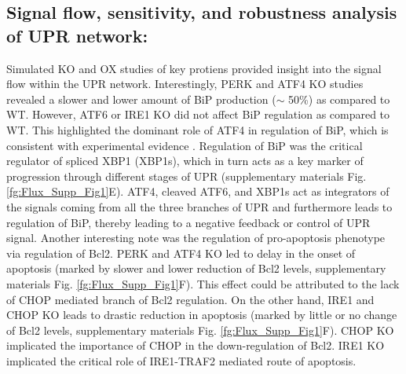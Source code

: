 \documentclass[fleqn,10pt]{wlscirep}
\begin{document}
\subsection*{Signal flow, sensitivity, and robustness analysis of UPR network:}
Simulated KO and OX studies of key protiens provided insight into the signal flow within the UPR network. Interestingly, PERK and ATF4 KO studies revealed a slower and lower amount of BiP production ($\sim$ 50\%) as compared to WT. However, ATF6 or IRE1 KO did not affect BiP regulation as compared to WT. This highlighted the dominant role of ATF4 in regulation of BiP, which is consistent with experimental evidence \cite{ma2003delineation}. Regulation of BiP was the critical regulator of spliced XBP1 (XBP1s), which in turn acts as a key marker of progression through different stages of UPR (supplementary materials Fig. \ref{fg:Flux_Supp_Fig1}E). ATF4, cleaved ATF6, and XBP1s act as integrators of the signals coming from all the three branches of UPR and furthermore leads to regulation of BiP, thereby leading to a negative feedback or control of UPR signal. Another interesting note was the regulation of pro-apoptosis phenotype via regulation of Bcl2. PERK and ATF4 KO led to delay in the onset of apoptosis (marked by slower and lower reduction of Bcl2 levels, supplementary materials Fig. \ref{fg:Flux_Supp_Fig1}F). This effect could be attributed to the lack of CHOP mediated branch of Bcl2 regulation. On the other hand, IRE1 and CHOP KO leads to drastic reduction in apoptosis (marked by little or no change of Bcl2 levels, supplementary materials Fig. \ref{fg:Flux_Supp_Fig1}F). CHOP KO implicated the importance of CHOP in the down-regulation of Bcl2. IRE1 KO implicated the critical role of IRE1-TRAF2 mediated route of apoptosis.
\end{document}
